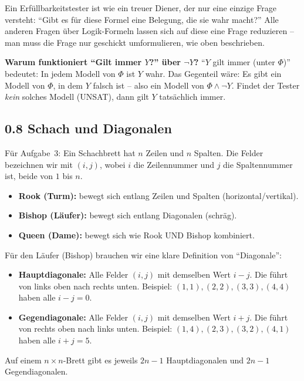 \documentclass[a4paper,12pt]{article}
\begin{document}
\begin{analogie}
Ein Erf\"ullbarkeitstester ist wie ein treuer Diener, der nur eine
einzige Frage versteht: "`Gibt es f\"ur diese Formel eine Belegung,
die sie wahr macht?"' Alle anderen Fragen \"uber Logik-Formeln
lassen sich auf diese eine Frage reduzieren -- man muss die Frage
nur geschickt umformulieren, wie oben beschrieben.
\end{analogie}

\textbf{Warum funktioniert "`Gilt immer $Y$?"' \"uber $\neg Y$?}
"`$Y$ gilt immer (unter $\Phi$)"' bedeutet: In jedem Modell von
$\Phi$ ist $Y$ wahr. Das Gegenteil w\"are: Es gibt ein Modell von
$\Phi$, in dem $Y$ falsch ist -- also ein Modell von $\Phi \wedge \neg Y$.
Findet der Tester \emph{kein} solches Modell (UNSAT), dann gilt
$Y$ tats\"achlich immer.

\subsection*{0.8 Schach und Diagonalen}

F\"ur Aufgabe~3: Ein Schachbrett hat $n$ Zeilen und $n$ Spalten.
Die Felder bezeichnen wir mit $(i, j)$, wobei $i$ die Zeilennummer
und $j$ die Spaltennummer ist, beide von $1$ bis $n$.

\begin{merkbox}[title={Schachfiguren -- Bewegungsmuster}]
\begin{itemize}[nosep]
\item \textbf{Rook (Turm):} bewegt sich entlang Zeilen und Spalten
      (horizontal/vertikal).
\item \textbf{Bishop (L\"aufer):} bewegt sich entlang Diagonalen
      (schr\"ag).
\item \textbf{Queen (Dame):} bewegt sich wie Rook UND Bishop
      kombiniert.
\end{itemize}
\end{merkbox}

F\"ur den L\"aufer (Bishop) brauchen wir eine klare Definition von
"`Diagonale"':

\begin{merkbox}[title={Diagonalen}]
\begin{itemize}[nosep]
\item \textbf{Hauptdiagonale:} Alle Felder $(i,j)$ mit demselben Wert
      $i - j$. Die f\"uhrt von links oben nach rechts unten.
      Beispiel: $(1,1), (2,2), (3,3), (4,4)$ haben alle $i-j = 0$.
\item \textbf{Gegendiagonale:} Alle Felder $(i,j)$ mit demselben Wert
      $i + j$. Die f\"uhrt von rechts oben nach links unten.
      Beispiel: $(1,4), (2,3), (3,2), (4,1)$ haben alle $i+j = 5$.
\end{itemize}
Auf einem $n \times n$-Brett gibt es jeweils $2n - 1$ Hauptdiagonalen
und $2n - 1$ Gegendiagonalen.
\end{merkbox}
\end{document}
